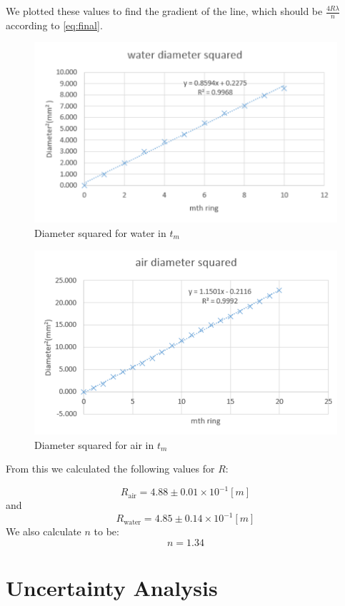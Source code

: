 \documentclass{article}
\begin{document}
We plotted these values to find the gradient of the line, which should be $\frac{4R\lambda}{n}$ according to \eqref{eq:final}.

\begin{figure}
  \includegraphics{./img/grap.pdf}
  \caption{Diameter squared for water in $t_m$}
  \label{fig:water}
\end{figure}

\begin{figure}
  \includegraphics{./img/graph.pdf}
  \caption{Diameter squared for air in $t_m$}
  \label{fig:water}
\end{figure}

From this we calculated the following values for $R$:

$$
 R_{\text{air}} = 4.88 \pm 0.01 \times 10^{-1} [m]
$$
and
$$
 R_{\text{water}} = 4.85 \pm 0.14 \times 10^{-1} [m]
$$
We also calculate $n$ to be:
$$
 n = 1.34
$$

\section{Uncertainty Analysis}
\end{document}
